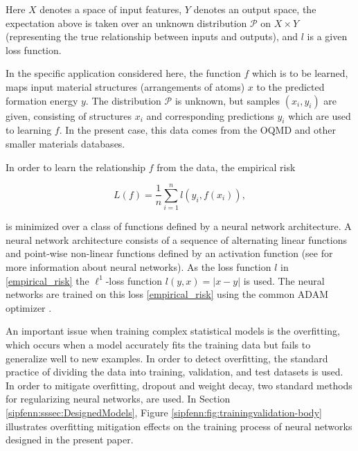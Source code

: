 Here $X$ denotes a space of input features, $Y$ denotes an output space, the expectation above is taken over an unknown distribution $\mathcal{P}$ on $X\times Y$ (representing the true relationship between inputs and outputs), and $l$ is a given loss function. 

In the specific application considered here, the function $f$ which is to be learned, maps input material structures (arrangements of atoms) $x$ to the predicted formation energy $y$. The distribution $\mathcal{P}$ is unknown, but samples $(x_i,y_i)$ are given, consisting of structures $x_i$ and corresponding predictions $y_i$ which are used to learning $f$. In the present case, this data comes from the OQMD and other smaller materials databases.


In order to learn the relationship $f$ from the data, the empirical risk

\begin{equation}\label{sipfenn:empirical_risk}
    L(f) = \frac{1}{n}\displaystyle\sum_{i=1}^n l(y_i, f(x_i)),
\end{equation}

is minimized over a class of functions defined by a neural network architecture. A neural network architecture consists of a sequence of alternating linear functions and point-wise non-linear functions defined by an activation function (see \cite{goodfellow2016deep} for more information about neural networks). As the loss function $l$ in \eqref{empirical_risk} the $\ell^1$-loss function $l(y,x) = |x-y|$ is used. The neural networks are trained on this loss \eqref{empirical_risk} using the common ADAM optimizer \cite{kingma2014adam}. 

An important issue when training complex statistical models is the overfitting, which occurs when a model accurately fits the training data but fails to generalize well to new examples. In order to detect overfitting, the standard practice of dividing the data into training, validation, and test datasets \cite{hastie2009elements} is used. In order to mitigate overfitting, dropout \cite{srivastava2014dropout} and weight decay, two standard methods for regularizing neural networks, are used. In Section \ref{sipfenn:sssec:DesignedModels}, Figure \ref{sipfenn:fig:trainingvalidation-body} illustrates overfitting mitigation effects on the training process of neural networks designed in the present paper.

